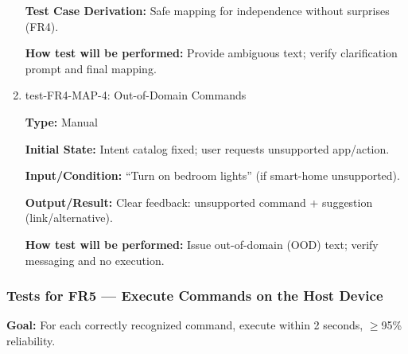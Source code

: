 \documentclass[12pt, titlepage]{article}
\begin{document}
\begin{enumerate}
\textbf{Test Case Derivation:} Safe mapping for independence without surprises (FR4).

\textbf{How test will be performed:} Provide ambiguous text; verify clarification prompt and final mapping.

\item{test-FR4-MAP-4: Out-of-Domain Commands\\}

\textbf{Type:} Manual

\textbf{Initial State:} Intent catalog fixed; user requests unsupported app/action.

\textbf{Input/Condition:} “Turn on bedroom lights” (if smart-home unsupported).

\textbf{Output/Result:} Clear feedback: unsupported command + suggestion (link/alternative).

\textbf{How test will be performed:} Issue out-of-domain (OOD) text; verify messaging and no execution.

\end{enumerate}

\subsubsection{Tests for FR5 — Execute Commands on the Host Device}


\textbf{Goal:} For each correctly recognized command, execute within 2 seconds, $\geq$95\% reliability.
\end{document}
